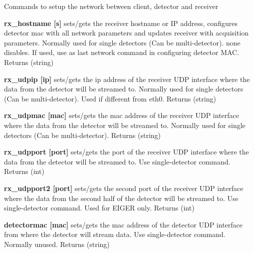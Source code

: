 Commands to setup the network between client, detector and receiver
\begin{DoxyItemize}
\item {\bfseries rx\_\-hostname \mbox{[}s\mbox{]}} sets/gets the receiver hostname or IP address, configures detector mac with all network parameters and updates receiver with acquisition parameters. Normally used for single detectors (Can be multi-\/detector). {\ttfamily none} disables. If used, use as last network command in configuring detector MAC. {\ttfamily Returns} {\ttfamily }(string)
\end{DoxyItemize}


\begin{DoxyItemize}
\item {\bfseries rx\_\-udpip \mbox{[}ip\mbox{]}} sets/gets the ip address of the receiver UDP interface where the data from the detector will be streamed to. Normally used for single detectors (Can be multi-\/detector). Used if different from eth0. {\ttfamily Returns} {\ttfamily }(string)
\end{DoxyItemize}


\begin{DoxyItemize}
\item {\bfseries rx\_\-udpmac \mbox{[}mac\mbox{]}} sets/gets the mac address of the receiver UDP interface where the data from the detector will be streamed to. Normally used for single detectors (Can be multi-\/detector). {\ttfamily Returns} {\ttfamily }(string)
\end{DoxyItemize}


\begin{DoxyItemize}
\item {\bfseries rx\_\-udpport \mbox{[}port\mbox{]}} sets/gets the port of the receiver UDP interface where the data from the detector will be streamed to. Use single-\/detector command. {\ttfamily Returns} {\ttfamily }(int)
\end{DoxyItemize}


\begin{DoxyItemize}
\item {\bfseries rx\_\-udpport2 \mbox{[}port\mbox{]}} sets/gets the second port of the receiver UDP interface where the data from the second half of the detector will be streamed to. Use single-\/detector command. Used for EIGER only. {\ttfamily Returns} {\ttfamily }(int)
\end{DoxyItemize}


\begin{DoxyItemize}
\item {\bfseries detectormac \mbox{[}mac\mbox{]}} sets/gets the mac address of the detector UDP interface from where the detector will stream data. Use single-\/detector command. Normally unused. {\ttfamily Returns} {\ttfamily }(string)
\end{DoxyItemize}


